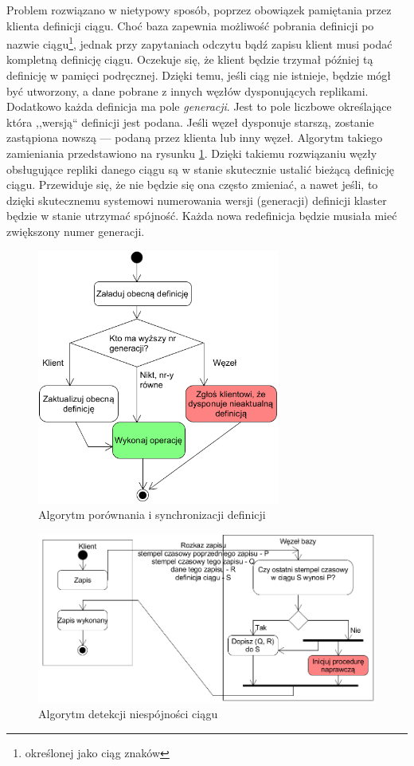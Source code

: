 \documentclass[a4paper,polish,12pt,twoside]{article}
\begin{document}
Problem rozwiązano w nietypowy sposób, poprzez obowiązek pamiętania przez klienta definicji ciągu. Choć baza zapewnia możliwość pobrania definicji po nazwie ciągu\footnote{określonej jako ciąg znaków}, jednak przy zapytaniach odczytu bądź zapisu klient musi podać kompletną definicję ciągu. Oczekuje się, że klient będzie trzymał później tą definicję w pamięci podręcznej. Dzięki temu, jeśli ciąg nie istnieje, będzie mógł być utworzony, a dane pobrane z innych węzłów dysponujących replikami. Dodatkowo każda definicja ma pole \textit{generacji}. Jest to pole liczbowe określające która ,,wersją`` definicji jest podana. Jeśli węzeł dysponuje starszą, zostanie zastąpiona nowszą --- podaną przez klienta lub inny węzeł. Algorytm takiego zamieniania przedstawiono na rysunku \ref{fig:definition_resolution}. Dzięki takiemu rozwiązaniu węzły obsługujące repliki danego ciągu są w stanie skutecznie ustalić bieżącą definicję ciągu. Przewiduje się, że nie będzie się ona często zmieniać, a nawet jeśli, to dzięki skutecznemu systemowi numerowania wersji (generacji) definicji klaster będzie w stanie utrzymać spójność. Każda nowa redefinicja będzie musiała mieć zwiększony numer generacji.

	\begin{figure}[h]
		\centering \includegraphics[width=8cm]{definition_resolution}
		\caption{Algorytm porównania i synchronizacji definicji}
		\label{fig:definition_resolution}
	\end{figure}

	\begin{figure}[h]
		\centering \includegraphics[width=14cm]{decgram}
		\caption{Algorytm detekcji niespójności ciągu}
		\label{fig:decgram}
	\end{figure}
\end{document}

